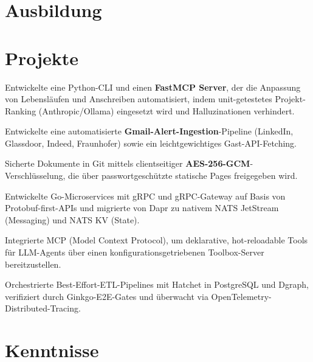 \documentclass[10pt,a4paper]{resume}
\begin{document}
\section{Ausbildung}

\vspace{2pt}

\section{Projekte}

\bullets
  \item Entwickelte eine Python-CLI und einen \textbf{FastMCP Server}, der die Anpassung von Lebensläufen und Anschreiben automatisiert, indem unit-getestetes Projekt-Ranking (Anthropic/Ollama) eingesetzt wird und Halluzinationen verhindert.
  \item Entwickelte eine automatisierte \textbf{Gmail-Alert-Ingestion}-Pipeline (LinkedIn, Glassdoor, Indeed, Fraunhofer) sowie ein leichtgewichtiges Gast-API-Fetching.
  \item Sicherte Dokumente in Git mittels clientseitiger \textbf{AES-256-GCM}-Verschlüsselung, die über passwortgeschützte statische Pages freigegeben wird.
\bulletsend
\vspace{1.0pt}
\bullets
  \item Entwickelte Go-Microservices mit gRPC und gRPC-Gateway auf Basis von Protobuf-first-APIs und migrierte von Dapr zu nativem NATS JetStream (Messaging) und NATS KV (State).
  \item Integrierte MCP (Model Context Protocol), um deklarative, hot-reloadable Tools für LLM-Agents über einen konfigurationsgetriebenen Toolbox-Server bereitzustellen.
  \item Orchestrierte Best-Effort-ETL-Pipelines mit Hatchet in PostgreSQL und Dgraph, verifiziert durch Ginkgo-E2E-Gates und überwacht via OpenTelemetry-Distributed-Tracing.
\bulletsend

\section{Kenntnisse}
\end{document}
